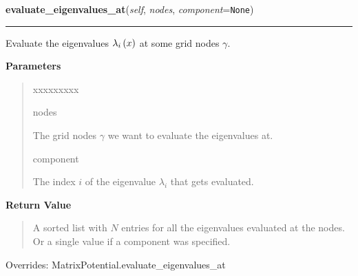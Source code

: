     \vspace{0.5ex}

\hspace{.8\funcindent}\begin{boxedminipage}{\funcwidth}

    \raggedright \textbf{evaluate\_eigenvalues\_at}(\textit{self}, \textit{nodes}, \textit{component}={\tt None})

    \vspace{-1.5ex}

    \rule{\textwidth}{0.5\fboxrule}
\setlength{\parskip}{2ex}
    Evaluate the eigenvalues
    $\lambda_i\left( x \right)$ at some grid
    nodes $\gamma$.

\setlength{\parskip}{1ex}
      \textbf{Parameters}
      \vspace{-1ex}

      \begin{quote}
        \begin{Ventry}{xxxxxxxxx}

          \item[nodes]

          The grid nodes $\gamma$ we want to evaluate the
          eigenvalues at.

          \item[component]

          The index $i$ of the eigenvalue $\lambda_i$
          that gets evaluated.

        \end{Ventry}

      \end{quote}

      \textbf{Return Value}
    \vspace{-1ex}

      \begin{quote}
      A sorted list with $N$ entries for all the eigenvalues evaluated at
      the nodes. Or a single value if a component was specified.

      \end{quote}



      Overrides: MatrixPotential.evaluate\_eigenvalues\_at

    \end{boxedminipage}

    \vspace{0.5ex}

